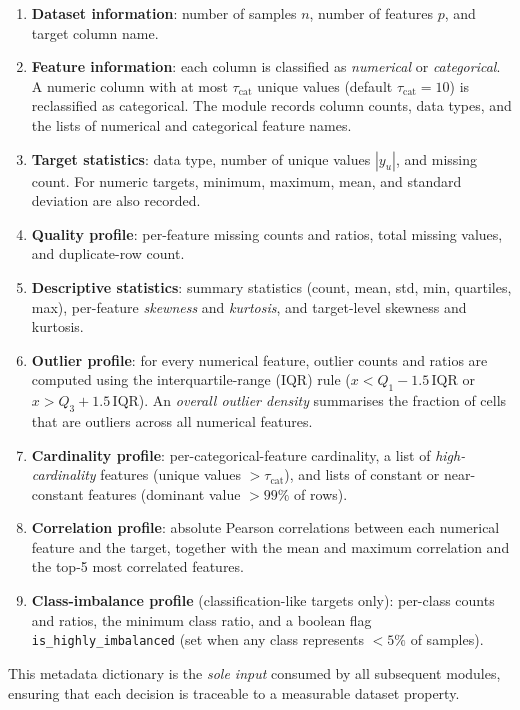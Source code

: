 \documentclass[conference]{llncs}
\begin{document}
   \begin{enumerate}
   \item \textbf{Dataset information}: number of samples $n$, number of features $p$, and target column name.
   \item \textbf{Feature information}: each column is classified as \emph{numerical} or \emph{categorical}. A numeric column with at most $\tau_\text{cat}$ unique values (default $\tau_\text{cat}=10$) is reclassified as categorical. The module records column counts, data types, and the lists of numerical and categorical feature names.
   \item \textbf{Target statistics}: data type, number of unique values $|y_u|$, and missing count. For numeric targets, minimum, maximum, mean, and standard deviation are also recorded.
   \item \textbf{Quality profile}: per-feature missing counts and ratios, total missing values, and duplicate-row count.
   \item \textbf{Descriptive statistics}: summary statistics (count, mean, std, min, quartiles, max), per-feature \emph{skewness} and \emph{kurtosis}, and target-level skewness and kurtosis.
   \item \textbf{Outlier profile}: for every numerical feature, outlier counts and ratios are computed using the interquartile-range (IQR) rule ($x < Q_1 - 1.5\,\text{IQR}$ or $x > Q_3 + 1.5\,\text{IQR}$). An \emph{overall outlier density} summarises the fraction of cells that are outliers across all numerical features.
   \item \textbf{Cardinality profile}: per-categorical-feature cardinality, a list of \emph{high-cardinality} features (unique values $>\tau_\text{cat}$), and lists of constant or near-constant features (dominant value $>99\%$ of rows).
   \item \textbf{Correlation profile}: absolute Pearson correlations between each numerical feature and the target, together with the mean and maximum correlation and the top-5 most correlated features.
   \item \textbf{Class-imbalance profile} (classification-like targets only): per-class counts and ratios, the minimum class ratio, and a boolean flag \texttt{is\_highly\_imbalanced} (set when any class represents $<5\%$ of samples).
   \end{enumerate}

   This metadata dictionary is the \emph{sole input} consumed by all subsequent modules, ensuring that each decision is traceable to a measurable dataset property.
\end{document}
